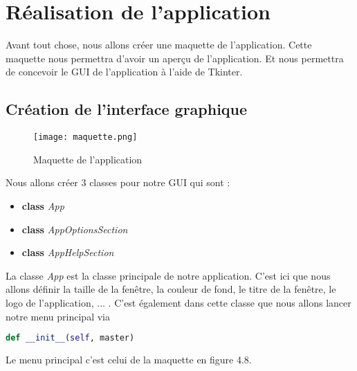     
    \section{Réalisation de l'application}
        Avant tout chose, nous allons créer une maquette de l'application.
        Cette maquette nous permettra d'avoir un aperçu de l'application.
        Et nous permettra de concevoir le GUI de l'application à l'aide de Tkinter.

        \subsection{Création de l'interface graphique}
            \begin{figure}[h]
                \centering
                \texttt{[image: maquette.png]} 
                \caption{Maquette de l'application}
            \end{figure}

            \begin{flushleft}
                Nous allons créer 3 classes pour notre GUI qui sont :
                \begin{itemize}
                    \item \textbf{class} \textit{App}
                    \item \textbf{class} \textit{AppOptionsSection}
                    \item \textbf{class} \textit{AppHelpSection}
                \end{itemize}
                
                La classe \textit{App} est la classe principale de notre application.
                C'est ici que nous allons définir la taille de la fenêtre, la couleur de fond, le titre de la fenêtre, le logo de l'application, ... .
                C'est également dans cette classe que nous allons lancer notre menu principal via \begin{lstlisting}[language=python]
                    def __init__(self, master)
                \end{lstlisting}
    
                Le menu principal c'est celui de la maquette en figure 4.8.                
            \end{flushleft}
        
            

